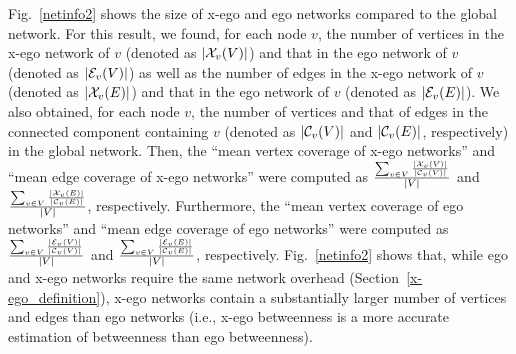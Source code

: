 Fig.~\ref{netinfo2} shows the size of x-ego and ego networks compared to the global network. 
For this result, we found, for each node $v$, the number of vertices in the x-ego network of $v$ (denoted as $|\mathcal{X}_{{v}}(V)|$) and that in the ego network of $v$ (denoted as $|\mathcal{E}_{{v}}(V)|$) as well as the number of edges in the x-ego network of $v$ (denoted as $|\mathcal{X}_{{v}}(E)|$) and that in the ego network of $v$ (denoted as $|\mathcal{E}_{{v}}(E)|$).
We also obtained, for each node $v$, the number of vertices and that of edges in the connected component containing $v$ (denoted as $|\mathcal{C}_{{v}}(V)|$ and $|\mathcal{C}_{{v}}(E)|$, respectively) in the global network.
Then, the ``mean vertex coverage of x-ego networks'' and ``mean edge coverage of x-ego networks'' were computed as $\frac{\sum_{v \in V} \frac{|\mathcal{X}_{{v}}(V)|}{|\mathcal{C}_{{v}}(V)|}}{|V|}$ and $\frac{\sum_{v \in V} \frac{|\mathcal{X}_{{v}}(E)|}{|\mathcal{C}_{{v}}(E)|}}{|V|}$, respectively.
Furthermore, the ``mean vertex coverage of ego networks'' and ``mean edge coverage of ego networks'' were computed as $\frac{\sum_{v \in V} \frac{|\mathcal{E}_{{v}}(V)|}{|\mathcal{C}_{{v}}(V)|}}{|V|}$ and $\frac{\sum_{v \in V} \frac{|\mathcal{E}_{{v}}(E)|}{|\mathcal{C}_{{v}}(E)|}}{|V|}$, respectively.
Fig.~\ref{netinfo2} shows that, while ego and x-ego networks require the same network overhead (Section~\ref{x-ego_definition}), x-ego networks contain a substantially larger number of vertices and edges than ego networks (i.e., x-ego betweenness is a more accurate estimation of betweenness than ego betweenness).

